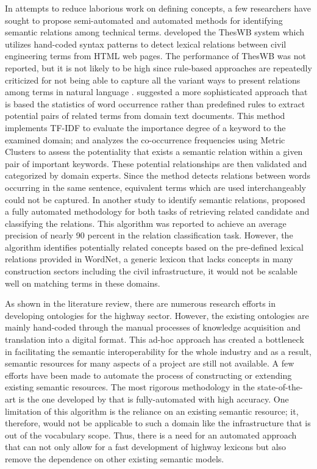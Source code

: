 \documentclass[Journal, BackFigs,NoLists, DoubleSpace]{ascelike}%
\begin{document}
In attempts to reduce laborious work on defining concepts, a few researchers have sought to propose semi-automated and automated methods for identifying semantic relations among technical terms.  developed the ThesWB system which utilizes hand-coded syntax patterns to detect lexical relations between civil engineering terms from HTML web pages. The performance of ThesWB was not reported, but it is not likely to be high since rule-based approaches are repeatedly criticized for not being able to capture all the variant ways to present relations among terms in natural language \cite{Marcus95,navigli10}.  suggested a more sophisticated approach that is based the statistics of word occurrence rather than predefined rules to extract potential pairs of related terms from domain text documents. This method implements TF-IDF to evaluate the importance degree of a keyword to the examined domain; and analyzes the co-occurrence frequencies using Metric Clusters to assess the potentiality that exists a semantic relation within a given pair of important keywords. These potential relationships are then validated and categorized by domain experts. Since the method detects relations between words occurring in the same sentence, equivalent terms which are used interchangeably could not be captured. In another study to identify semantic relations,  proposed a fully automated methodology for both tasks of retrieving related candidate and classifying the relations. This algorithm was reported to achieve an average precision of nearly 90 percent in the relation classification task. However, the algorithm identifies potentially related concepts based on the pre-defined lexical relations provided in WordNet, a generic lexicon that lacks concepts in many construction sectors including the civil infrastructure, it would not be scalable well on matching terms in these domains.
\par
As shown in the literature review, there are numerous research efforts in developing ontologies for the highway sector. However, the existing ontologies are mainly hand-coded through the manual processes of knowledge acquisition and translation into a digital format. This ad-hoc approach has created a bottleneck in facilitating the semantic interoperability for the whole industry and as a result, semantic resources for many aspects of a project are still not available. A few efforts have been made to automate the process of constructing or extending existing semantic resources. The most rigorous methodology in the state-of-the-art is the one developed by  that is fully-automated with high accuracy. One limitation of this algorithm is the reliance on an existing semantic resource; it, therefore, would not be applicable to such a domain like the infrastructure that is out of the vocabulary scope. Thus, there is a need for an automated approach that can not only allow for a fast development of highway lexicons but also remove the dependence on other existing semantic models. 
%
\end{document}
